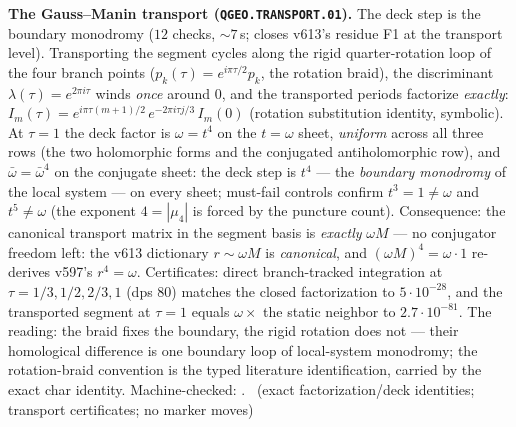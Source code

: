 \par\smallskip\noindent\textbf{The Gauss--Manin transport
(\texttt{QGEO.TRANSPORT.01}).}
The deck step is the boundary monodromy ($12$ checks, ${\sim}7$\,s;
closes v613's residue F1 at the transport level).  Transporting the
segment cycles along the rigid quarter-rotation loop of the four
branch points ($p_k(\tau)=e^{i\pi\tau/2}p_k$, the rotation braid),
the discriminant $\lambda(\tau)=e^{2\pi i\tau}$ winds \emph{once}
around $0$, and the transported periods factorize \emph{exactly}:
$I_m(\tau)=e^{i\pi\tau(m+1)/2}\,e^{-2\pi i\tau j/3}\,I_m(0)$
(rotation substitution identity, symbolic).  At $\tau=1$ the deck
factor is $\omega=t^4$ on the $t=\omega$ sheet, \emph{uniform}
across all three rows (the two holomorphic forms and the conjugated
antiholomorphic row), and $\bar\omega=\bar\omega^4$ on the conjugate
sheet: the deck step is $t^4$ --- the \emph{boundary monodromy} of
the local system --- on every sheet; must-fail controls confirm
$t^3=1\ne\omega$ and $t^5\ne\omega$ (the exponent $4=|\mu_4|$ is
forced by the puncture count).  Consequence: the canonical transport
matrix in the segment basis is \emph{exactly} $\omega M$ --- no
conjugator freedom left: the v613 dictionary $r\sim\omega M$ is
\emph{canonical}, and $(\omega M)^4=\omega\cdot 1$ re-derives
v597's $r^4=\omega$.  Certificates: direct branch-tracked
integration at $\tau=1/3,1/2,2/3,1$ (dps $80$) matches the closed
factorization to $5\cdot10^{-28}$, and the transported segment at
$\tau=1$ equals $\omega\times$ the static neighbor to
$2.7\cdot10^{-81}$.  The reading: the braid fixes the boundary, the
rigid rotation does not --- their homological difference is one
boundary loop of local-system monodromy; the rotation-braid
convention is the typed literature identification, carried by the
exact char identity.
Machine-checked: .
\mE\ (exact factorization/deck identities; transport certificates;
no marker moves)
\par\smallskip

